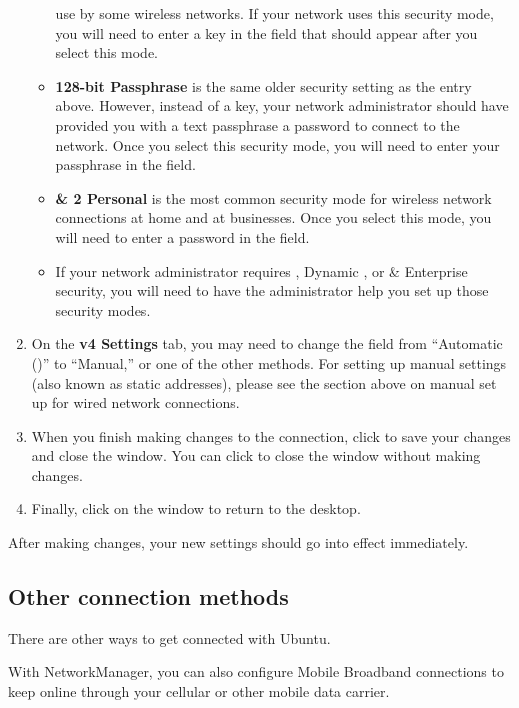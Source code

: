 \begin{enumerate}
\begin{itemize}
use by some wireless networks. If your network uses this security mode, you
will need to enter a key in the  field that should appear after
you select this mode.
    \item \textbf{ 128-bit Passphrase} is the same older security setting
as the entry above. However, instead of a key, your network administrator
should have provided you with a text passphrase \dash a password \dash to connect 
to the network. Once you select this security mode, you will need to enter your
passphrase in the  field.
    \item \textbf{ \& 2 Personal} is the most common security mode for
wireless network connections at home and at businesses. Once you select this
mode, you will need to enter a password in the  field.
    \item If your network administrator requires , Dynamic , or 
       \&  Enterprise security, you will need to have the administrator help
you set up those security modes.
  \end{itemize}
\item On the \textbf{v4 Settings} tab, you may need to change the 
   field from ``Automatic ()'' to ``Manual,'' or one of the 
other methods. For setting up manual settings (also known as static addresses), 
please see the section above on manual set up for wired network connections.
  \item When you finish making changes to the connection, click 
to save your changes and close the window. You can click  to 
close the window without making changes.
\item Finally, click  on the 
window to return to the desktop.
\end{enumerate}

After making changes, your new settings should go into effect immediately.

\subsection{Other connection methods}

There are other ways to get connected with Ubuntu. 

With NetworkManager, you can also configure Mobile Broadband connections 
to keep online through your cellular or other mobile data carrier. 


